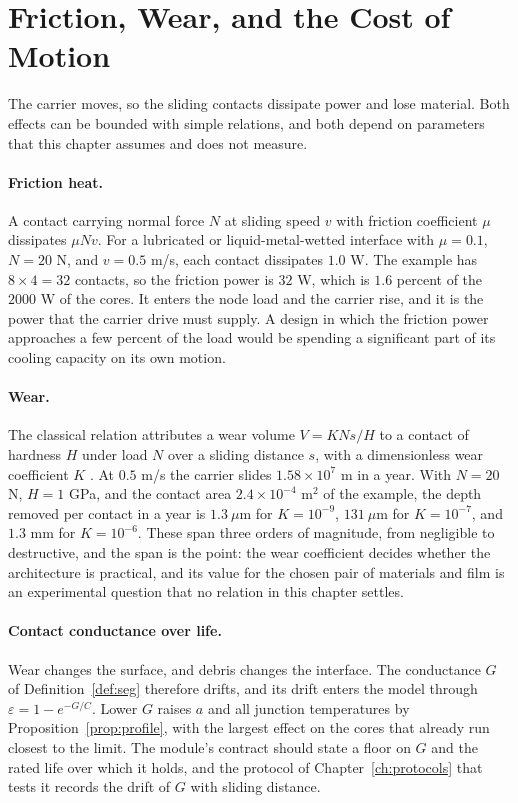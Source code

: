 \documentclass[11pt,openany]{book}
\theoremstyle{plain}
\theoremstyle{definition}
\theoremstyle{remark}
\begin{document}
\section{Friction, Wear, and the Cost of Motion}
\label{sec:wear}

The carrier moves, so the sliding contacts dissipate power and lose material. Both effects can be bounded with simple relations, and both depend on parameters that this chapter assumes and does not measure.

\paragraph{Friction heat.} A contact carrying normal force $N$ at sliding speed $v$ with friction coefficient $\mu$ dissipates $\mu N v$. For a lubricated or liquid-metal-wetted interface with $\mu=0.1$, $N=20$ N, and $v=0.5$ m/s, each contact dissipates $1.0$ W. The example has $8\times 4=32$ contacts, so the friction power is $32$ W, which is $1.6$ percent of the $2000$ W of the cores. It enters the node load and the carrier rise, and it is the power that the carrier drive must supply. A design in which the friction power approaches a few percent of the load would be spending a significant part of its cooling capacity on its own motion.

\paragraph{Wear.} The classical relation attributes a wear volume $V=KNs/H$ to a contact of hardness $H$ under load $N$ over a sliding distance $s$, with a dimensionless wear coefficient $K$ \cite{archard}. At $0.5$ m/s the carrier slides $1.58\times10^{7}$ m in a year. With $N=20$ N, $H=1$ GPa, and the contact area $2.4\times10^{-4}$ m$^2$ of the example, the depth removed per contact in a year is $1.3\ \mu$m for $K=10^{-9}$, $131\ \mu$m for $K=10^{-7}$, and $1.3$ mm for $K=10^{-6}$. These span three orders of magnitude, from negligible to destructive, and the span is the point: the wear coefficient decides whether the architecture is practical, and its value for the chosen pair of materials and film is an experimental question that no relation in this chapter settles.

\paragraph{Contact conductance over life.} Wear changes the surface, and debris changes the interface. The conductance $G$ of Definition~\ref{def:seg} therefore drifts, and its drift enters the model through $\varepsilon=1-e^{-G/C}$. Lower $G$ raises $a$ and all junction temperatures by Proposition~\ref{prop:profile}, with the largest effect on the cores that already run closest to the limit. The module's contract should state a floor on $G$ and the rated life over which it holds, and the protocol of Chapter~\ref{ch:protocols} that tests it records the drift of $G$ with sliding distance.
\end{document}
